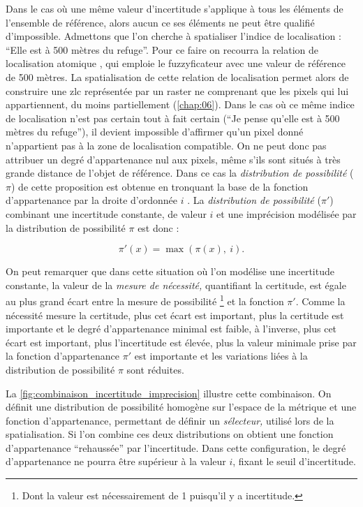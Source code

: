 Dans le cas où une même valeur d'incertitude s'applique à tous les
éléments de l'ensemble de référence, alors aucun ce ses éléments ne
peut être qualifié d'impossible.
%
Admettons que l'on cherche à spatialiser l'indice de localisation :
\enquote{Elle est à 500 mètres du refuge}. Pour ce faire on recourra
la relation de localisation atomique
, qui emploie le fuzzyficateur
 avec une valeur de référence de 500 mètres. La
spatialisation de cette relation de localisation permet alors de
construire une \ac{zlc} représentée par un raster ne comprenant que
les pixels qui lui appartiennent, du moins partiellement
(\autoref{chap:06}). Dans le cas où ce même indice de localisation
n'est pas certain tout à fait certain (\eg \enquote{Je pense qu'elle
  est à 500 mètres du refuge}), il devient impossible d'affirmer qu'un
pixel donné n'appartient pas à la zone de localisation compatible. On
ne peut donc pas attribuer un degré d'appartenance nul aux pixels,
même s'ils sont situés à très grande distance de l'objet de
référence. Dans ce cas la \emph{distribution de possibilité} (\(π\))
de cette proposition est obtenue en tronquant la base de la fonction
d'appartenance par la droite d'ordonnée \(i\)
\autocite{Bouchon-Meunier2007}. La \emph{distribution de possibilité}
(\(π'\)) combinant une incertitude constante, de valeur \(i\) et une
imprécision modélisée par la distribution de possibilité \(\pi\) est
donc :

\begin{equation}
  \label{eq:incert_imp}
  π'(x) = \max(π(x),\ i).  
\end{equation}

On peut remarquer que dans cette situation où l'on modélise une
incertitude constante, la valeur de la \emph{mesure de nécessité,}
quantifiant la certitude, est égale au plus grand écart entre la
mesure de possibilité \footnote{Dont la valeur est nécessairement de 1
  puisqu’il y a incertitude.} et la fonction \(\pi'\). Comme la
nécessité mesure la certitude, plus cet écart est important, plus la
certitude est importante et le degré d'appartenance minimal est
faible, à l'inverse, plus cet écart est important, plus l'incertitude
est élevée, plus la valeur minimale prise par la fonction
d'appartenance \(\pi'\) est importante et les variations liées à la
distribution de possibilité \(\pi\) sont réduites.

La \autoref{fig:combinaison_incertitude_imprecision} illustre cette
combinaison. On définit une distribution de possibilité homogène sur
l'espace de la métrique et une fonction d'appartenance, permettant de
définir un \emph{sélecteur,} utilisé lors de la spatialisation. Si
l'on combine ces deux distributions on obtient une fonction
d'appartenance \enquote{rehaussée} par l'incertitude. Dans cette
configuration, le degré d'appartenance ne pourra être supérieur à la
valeur \(i\), fixant le seuil d'incertitude.

